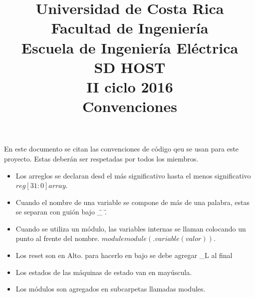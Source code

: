 

\title{Universidad de Costa Rica\\{\small Facultad de Ingeniería\\Escuela de Ingeniería
    Eléctrica\\SD HOST\\II ciclo 2016\\\vspace*{0.55in} Convenciones}}





En este documento se citan las convenciones de código qeu se usan para este proyecto. Estas deberán
ser respetadas por todos los miembros. 

\begin{itemize}
\item Los arreglos se declaran desd el más significativo hasta el menos significativo $reg [31:0] array$.
\item Cuando el nombre de una variable se compone de más de una palabra, estas se separan con guión
  bajo \"\_ \".
\item Cuando se utiliza un módulo, las variables internas se llaman colocando un punto al frente del
  nombre. $module module(.variable(valor))$. 
\item Los reset son en Alto. para hacerlo en bajo se debe agregar \_L al final
\item Los estados de las máquinas de estado van en mayúscula.
\item Los módulos son agregados en subcarpetas llamadas modules.
\end{itemize}
\newpage


\grid
